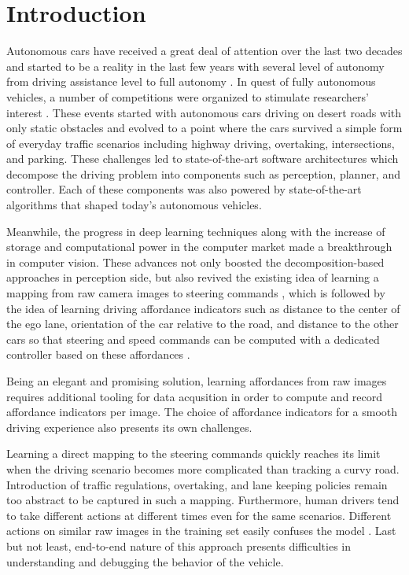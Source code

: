 \chapter{Introduction}
\label{chp:b1}

Autonomous cars have received a great deal of attention over the last two
decades and started to be a reality in the last few years with several level of
autonomy from driving assistance level to full autonomy
\cite{Holstein2018EthicalAS}. In quest of fully autonomous vehicles, a number
of competitions were organized to stimulate researchers' interest
\cite{Buehler2007The2D, Buehler2009TheDU}. These events started with autonomous
cars driving on desert roads with only static obstacles and evolved to a point
where the cars survived a simple form of everyday traffic scenarios including
highway driving, overtaking, intersections, and parking. These challenges led
to state-of-the-art software architectures which decompose the driving problem
into components such as perception, planner, and controller. Each of these
components was also powered by state-of-the-art algorithms that shaped today's
autonomous vehicles.

Meanwhile, the progress in deep learning techniques along with the increase of
storage and computational power in the computer market made a breakthrough in
computer vision. These advances not only boosted the decomposition-based
approaches in perception side, but also revived the existing idea of learning a
mapping from raw camera images to steering commands \cite{Bojarski2016EndTE},
which is followed by the idea of learning driving affordance indicators such as
distance to the center of the ego lane, orientation of the car relative to the
road, and distance to the other cars so that steering and speed commands can be
computed with a dedicated controller based on these affordances
\cite{Chen2015DeepDrivingLA}.

Being an elegant and promising solution, learning affordances from raw
images requires additional tooling for data acqusition in order to compute and
record affordance indicators per image. The choice of affordance indicators for
a smooth driving experience also presents its own challenges.

Learning a direct mapping to the steering commands quickly reaches its limit
when the driving scenario becomes more complicated than tracking a curvy
road. Introduction of traffic regulations, overtaking, and lane keeping
policies remain too abstract to be captured in such a mapping. Furthermore,
human drivers tend to take different actions at different times even for the
same scenarios. Different actions on similar raw images in the training set
easily confuses the model \cite{Chen2015DeepDrivingLA}. Last but not least,
end-to-end nature of this approach presents difficulties in understanding and
debugging the behavior of the vehicle.

